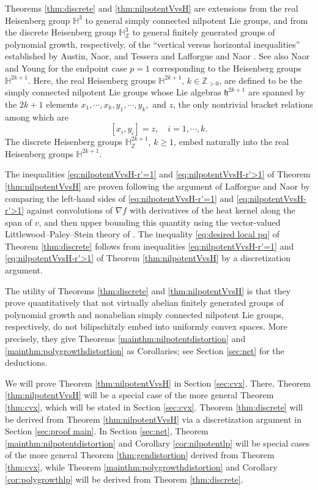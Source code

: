 \documentclass[11pt,reqno]{amsart}
\newcommand{\1}{\mathbf 1}
\newcommand{\bbh}{\mathbb H}
\begin{document}
Theorems \ref{thm:discrete} and \ref{thm:nilpotentVvsH} are extensions from the real Heisenberg group $\bbh^{3}$ to general simply connected nilpotent Lie groups, and from the discrete Heisenberg group $\mathbb{H}^{3}_\mathbb{Z}$ to general finitely generated groups of polynomial growth, respectively, of the ``vertical versus horizontal inequalities'' established by Austin, Naor, and Tessera \cite{austin2013sharp} and Lafforgue and Naor \cite{lafforgue2014vertical}. See also Naor and Young \cite{naor2018vertical,naor2022foliated} for the endpoint case $p=1$ corresponding to the Heisenberg groups $\mathbb{H}^{2k+1}$. Here, the real Heisenberg groups $\bbh^{2k+1}$, $k\in \mathbb{Z}_{>0}$, are defined to be the simply connected nilpotent Lie groups whose Lie algebras $\mathfrak{h}^{2k+1}$ are spanned by the $2k+1$ elements $x_1,\cdots,x_k,y_1,\cdots,y_k,$ and $z$, the only nontrivial bracket relations among which are
\[
\left[x_i,y_i\right]=z,\quad i=1,\cdots,k.
\]
The discrete Heisenberg groups $\mathbb{H}^{2k+1}_\mathbb{Z}$, $k\ge 1$, embed naturally into the real Heisenberg groups $\mathbb{H}^{2k+1}$.

The inequalities \eqref{eq:nilpotentVvsH-r'=1} and \eqref{eq:nilpotentVvsH-r'>1} of Theorem \ref{thm:nilpotentVvsH} are proven following the argument of Lafforgue and Naor \cite{lafforgue2014vertical} by comparing the left-hand sides of \eqref{eq:nilpotentVvsH-r'=1} and \eqref{eq:nilpotentVvsH-r'>1} against convolutions of $\nabla f$ with derivatives of the heat kernel along the span of $v$, and then upper bounding this quantity using the vector-valued Littlewood--Paley--Stein theory of \cite{hytonen2019heat,martinez2006vector,xu2020vector}. The inequality \eqref{eq:desired local pq} of Theorem \ref{thm:discrete} follows from inequalities \eqref{eq:nilpotentVvsH-r'=1} and \eqref{eq:nilpotentVvsH-r'>1} of Theorem \ref{thm:nilpotentVvsH} by a discretization argument.

The utility of Theorems \ref{thm:discrete} and \ref{thm:nilpotentVvsH} is that they prove quantitatively that not virtually abelian finitely generated groups of polynomial growth and nonabelian simply connected nilpotent Lie groups, respectively, do not bilipschitzly embed into uniformly convex spaces. More precisely, they give Theorems \ref{mainthm:nilpotentdistortion} and \ref{mainthm:polygrowthdistortion} as Corollaries; see Section \ref{sec:net} for the deductions.



We will prove Theorem \ref{thm:nilpotentVvsH} in Section \ref{sec:cvx}. There, Theorem \ref{thm:nilpotentVvsH} will be a special case of the more general Theorem \ref{thm:cvx}, which will be stated in Section \ref{sec:cvx}. Theorem \ref{thm:discrete} will be derived from Theorem \ref{thm:nilpotentVvsH} via a discretization argument in Section \ref{sec:proof main}. In Section \ref{sec:net}, Theorem \ref{mainthm:nilpotentdistortion} and Corollary \ref{cor:nilpotentlp} will be special cases of the more general Theorem \ref{thm:gendistortion} derived from Theorem \ref{thm:cvx}, while Theorem \ref{mainthm:polygrowthdistortion} and Corollary \ref{cor:polygrowthlp} will be derived from Theorem \ref{thm:discrete}.
\end{document}
